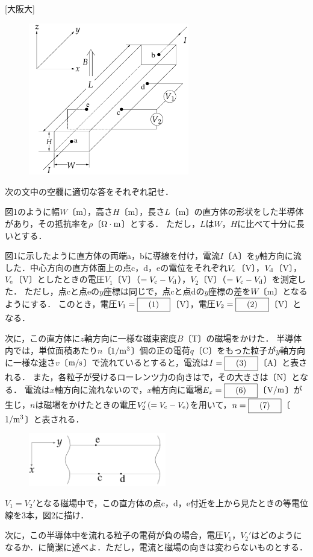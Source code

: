 



\noindent{} [大阪大]

\begin{figure}
  \centering
  \includegraphics[width=7cm]{fig/fig_4_5_1.pdf}
  \caption{}
\end{figure}
次の文中の空欄に適切な答をそれぞれ記せ．

図1のように幅$W$〔m〕，高さ$H$〔m〕，長さ$L$〔m〕の直方体の形状をした半導体があり，その抵抗率を$\rho$\nobreak〔$\Omega \cdot \mathrm{m}$〕とする．
ただし，$L$は$W$，$H$に比べて十分に長いとする．

図1に示したように直方体の両端a，bに導線を付け，電流$I$〔A〕を$y$軸方向に流した．中心方向の直方体面上の点c，d，eの電位をそれぞれ$V_\mathrm{c}$〔V〕，$V_\mathrm{d}$\nobreak〔V〕，$V_\mathrm{e}$〔V〕としたときの電圧$V_1$〔V〕（$= V_\mathrm{c} - V_\mathrm{d}$），$V_2$\nobreak〔V〕\nobreak（$=V_\mathrm{c} - V_\mathrm{d}$）を測定した．
ただし，点cと点eの$y$座標は同じで，点cと点dの$y$座標の差を$W$\nobreak〔m〕となるようにする．
このとき，電圧$V_1 = \text{\boxnum{1}}$〔V〕，電圧$V_2 = \text{\boxnum{2}}$〔V〕となる．

次に，この直方体に$z$軸方向に一様な磁束密度$B$〔T〕の磁場をかけた．
半導体内では，単位面積あたり$n$〔$1 / \mathrm{m}^3$〕個の正の電荷$q$〔C〕をもった粒子が$y$軸方向に一様な速さ$v$〔$\mathrm{m} / \mathrm{s}$〕で流れているとすると，電流は$I = \text{\boxnum{3}}$〔A〕と表される．
また，各粒子が受けるローレンツ力の向きはで，その大きさは〔N〕となる．
電流は$x$軸方向に流れないので，$x$軸方向に電場$E_x = \text{\boxnum{6}}$〔$\mathrm{V} / \mathrm{m}$〕が生じ，$n$は磁場をかけたときの電圧$V_2'\, (= V_\mathrm{c} - V_\mathrm{e})$を用いて，$n = \text{\boxnum{7}}$〔$1 / \mathrm{m}^3$〕と表される．

\begin{figure}
  \centering
  \includegraphics[width=6cm]{fig/fig_4_5_2.pdf}
  \caption{}
\end{figure}
$V_1 = V_2'$となる磁場中で，この直方体の点c，d，e付近を上から見たときの等電位線を3本，図2に描け．

次に，この半導体中を流れる粒子の電荷が負の場合，電圧$V_1$，$V_2'$はどのようになるか．に簡潔に述べよ．ただし，電流と磁場の向きは変わらないものとする．


